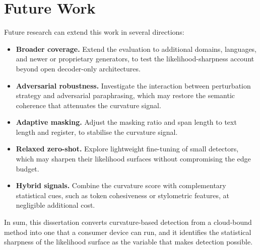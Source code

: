 \documentclass[logo,msc,cs]{infthesis}      %
\begin{document}
\section{Future Work}
\label{sec:future_work}
Future research can extend this work in several directions:
\begin{itemize}
\item \textbf{Broader coverage.} Extend the evaluation to additional domains, languages, and newer or proprietary generators, to test the likelihood-sharpness account beyond open decoder-only architectures.
\item \textbf{Adversarial robustness.} Investigate the interaction between perturbation strategy and adversarial paraphrasing, which may restore the semantic coherence that attenuates the curvature signal.
\item \textbf{Adaptive masking.} Adjust the masking ratio and span length to text length and register, to stabilise the curvature signal.
\item \textbf{Relaxed zero-shot.} Explore lightweight fine-tuning of small detectors, which may sharpen their likelihood surfaces without compromising the edge budget.
\item \textbf{Hybrid signals.} Combine the curvature score with complementary statistical cues, such as token cohesiveness or stylometric features, at negligible additional cost.
\end{itemize}
In sum, this dissertation converts curvature-based detection from a cloud-bound method into one that a consumer device can run, and it identifies the statistical sharpness of the likelihood surface as the variable that makes detection possible.




\appendix
\end{document}
